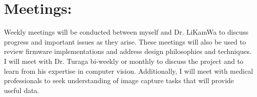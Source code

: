 \section{Meetings:}

\indent Weekly meetings will be conducted between myself and Dr. LiKamWa to discuss progress and important issues as they arise.
These meetings will also be used to review firmware implementations and address design philosophies and techniques. I will meet
with Dr. Turaga bi-weekly or monthly to discuss the project and to learn from his expertise in computer vision. Additionally,
I will meet with medical professionals to seek understanding of image capture tasks that will provide useful data.
